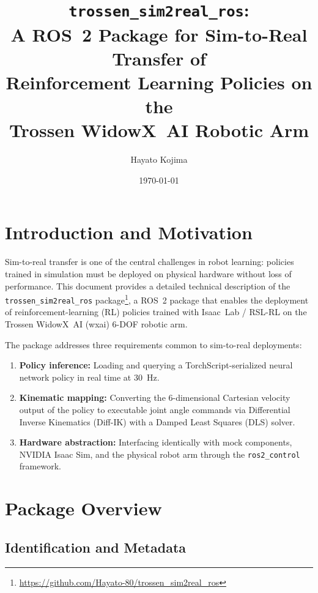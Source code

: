 \documentclass[12pt, a4paper]{article}
\title{%
  \texttt{trossen\_sim2real\_ros}:\\
  A ROS~2 Package for Sim-to-Real Transfer of \\
  Reinforcement Learning Policies on the \\
  Trossen WidowX~AI Robotic Arm}
\author{Hayato Kojima}
\date{\today}
\begin{document}
\maketitle
\tableofcontents
\clearpage

\section{Introduction and Motivation}
\label{sec:intro}

Sim-to-real transfer is one of the central challenges in robot learning: policies trained
in simulation must be deployed on physical hardware without loss of performance.
This document provides a detailed technical description of the \texttt{trossen\_sim2real\_ros}
package\footnote{\url{https://github.com/Hayato-80/trossen\_sim2real\_ros}},
a ROS~2 package that enables the deployment of reinforcement-learning (RL) policies
trained with Isaac~Lab / RSL-RL on the Trossen WidowX~AI (wxai) 6-DOF robotic arm.

The package addresses three requirements common to sim-to-real deployments:
\begin{enumerate}
  \item \textbf{Policy inference:} Loading and querying a TorchScript-serialized neural
        network policy in real time at 30~Hz.
  \item \textbf{Kinematic mapping:} Converting the 6-dimensional Cartesian velocity output
        of the policy to executable joint angle commands via Differential Inverse Kinematics
        (Diff-IK) with a Damped Least Squares (DLS) solver.
  \item \textbf{Hardware abstraction:} Interfacing identically with mock components,
        NVIDIA Isaac Sim, and the physical robot arm through the \texttt{ros2\_control}
        framework.
\end{enumerate}

\section{Package Overview}
\label{sec:overview}

\subsection{Identification and Metadata}
\label{ssec:meta}
\end{document}
